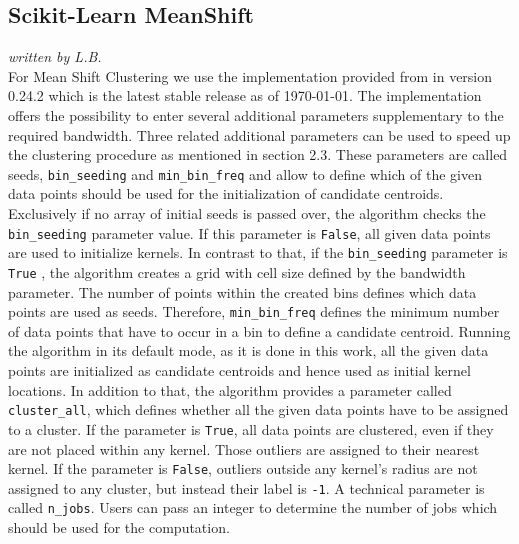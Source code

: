 \subsection{Scikit-Learn MeanShift}
\label{subsec:sklearn_meanshift}
\textit{written by L.B.}\\

For Mean Shift Clustering we use the implementation provided from \cite{sklearn_api} in version 0.24.2 which is the latest stable release as of \today. 
The implementation offers the possibility to enter several additional parameters supplementary to the required bandwidth. Three related additional parameters can be used to speed up the clustering procedure as mentioned in section 2.3. These parameters are called seeds, \texttt{bin_seeding} and \texttt{min_bin_freq} and allow to define which of the given data points should be used for the initialization of candidate centroids. Exclusively if no array of initial seeds is passed over, the algorithm checks the \texttt{bin_seeding} parameter value. If this parameter is \texttt{False}, all given data points are used to initialize kernels. In contrast to that, if the \texttt{bin_seeding} parameter is \texttt{True} , the algorithm creates a grid with cell size defined by the bandwidth parameter. The number of points within the created bins defines which data points are used as seeds. Therefore, \texttt{min_bin_freq} defines the minimum number of data points that have to occur in a bin to define a candidate centroid.
Running the algorithm in its default mode, as it is done in this work, all the given data points are initialized as candidate centroids and hence used as initial kernel locations. 
In addition to that, the algorithm provides a parameter called \texttt{cluster_all}, which defines whether all the given data points have to be assigned to a cluster. If the parameter is \texttt{True}, all data points are clustered, even if they are not placed within any kernel. Those outliers are assigned to their nearest kernel. If the parameter is \texttt{False}, outliers outside any kernel's radius are not assigned to any cluster, but instead their label is \texttt{-1}. 
A technical parameter is called \texttt{n_jobs}. Users can pass an integer to determine the number of jobs which should be used for the computation.\\
